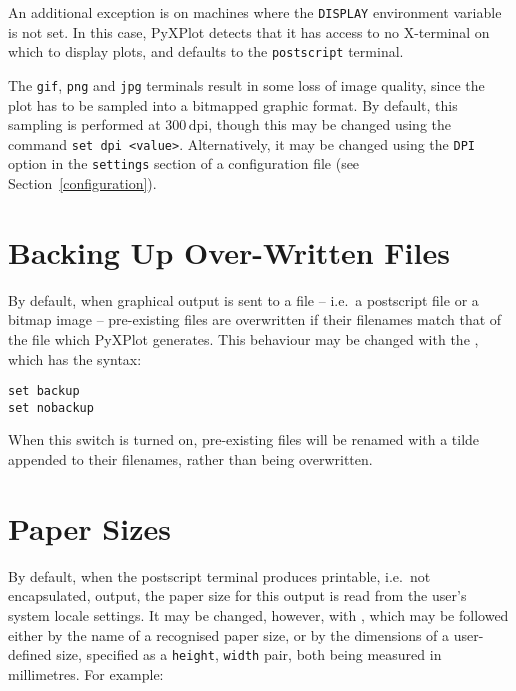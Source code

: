 An additional exception is on machines where the {\tt DISPLAY} environment
variable is not set. In this case, PyXPlot detects that it has access to no
X-terminal on which to display plots, and defaults to the {\tt postscript}
terminal.

The {\tt gif}, {\tt png} and {\tt jpg} terminals result in some loss of image
quality, since the plot has to be sampled into a bitmapped graphic format.  By
default, this sampling is performed at $300\,\mathrm{dpi}$, though this may be
changed using the command {\tt set dpi <value>}. Alternatively, it may be
changed using the {\tt DPI} option in the {\tt settings} section of a
configuration file (see Section~\ref{configuration}).

\section{Backing Up Over-Written Files}

\label{filebackup}

By default, when graphical output is sent to a file -- i.e.\ a postscript file or
a bitmap image -- pre-existing files are overwritten if their filenames match
that of the file which PyXPlot generates. This behaviour may be changed with
the , which has the syntax:

\begin{verbatim}
set backup
set nobackup
\end{verbatim}

When this switch is turned on, pre-existing files will be renamed with a tilde
appended to their filenames, rather than being overwritten.

\section{Paper Sizes}

By default, when the postscript terminal produces printable, i.e.\ not
encapsulated, output, the paper size for this output is read from the user's
system locale settings. It may be changed, however, with , which may be followed either by the name of a recognised paper
size, or by the dimensions of a user-defined size, specified as a {\tt height},
{\tt width} pair, both being measured in millimetres. For example:

